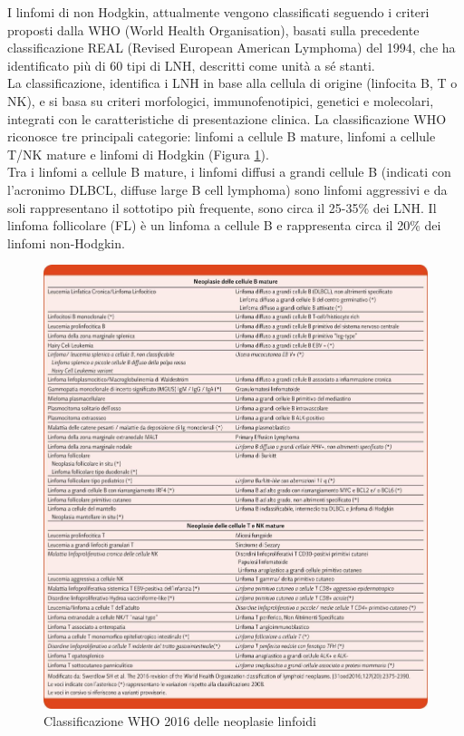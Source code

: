 I linfomi di non Hodgkin, attualmente vengono classificati seguendo i criteri proposti dalla WHO 
(World Health Organisation), basati sulla precedente classificazione REAL (Revised European American Lymphoma) 
del 1994, che ha identificato più di 60 tipi di LNH, descritti come unità a sé stanti\cite{AIOM}.\\
La classificazione, identifica i LNH in base alla cellula di origine 
(linfocita B, T o NK), e si basa su criteri morfologici, immunofenotipici, genetici e molecolari, 
integrati con le caratteristiche di presentazione clinica\cite{AIOM}. 
La classificazione WHO riconosce tre principali categorie: linfomi a cellule B mature, linfomi a cellule T/NK
mature e linfomi di Hodgkin (Figura \ref{fig:FIGURE_2.13}).\\
Tra i linfomi a cellule B mature, i linfomi diffusi a grandi cellule B (indicati con l’acronimo DLBCL, 
diffuse large B cell lymphoma) sono linfomi aggressivi e da soli rappresentano il sottotipo più frequente, 
sono circa il 25-35\% dei LNH\cite{AIOM}.
Il linfoma follicolare (FL) è un linfoma a cellule B e rappresenta circa il 20\% dei linfomi non-Hodgkin.

\begin{figure}[H]
    \begin{center}
    \includegraphics[width=1.0\columnwidth]{img/CLASS.WHO.jpeg}
    \vspace{-3mm}
    \end{center}
    \caption{Classificazione WHO 2016 delle neoplasie linfoidi
    \cite{img15-18}}
    \label{fig:FIGURE_2.13}
\end{figure}

